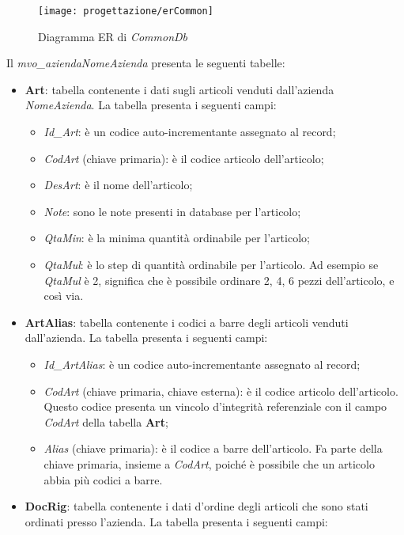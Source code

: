 \begin{figure}[!h] 
    \centering 
    \texttt{[image: progettazione/erCommon]} 
    \caption{Diagramma ER di \textit{CommonDb}}
\end{figure}

Il \textit{mvo\_aziendaNomeAzienda} presenta le seguenti tabelle:
\begin{itemize}
	\item \textbf{Art}: tabella contenente i dati sugli articoli venduti dall'azienda \textit{NomeAzienda}. La tabella presenta i seguenti campi:
		\begin{itemize}
			\item \textit{Id\_Art}: è un codice auto-incrementante assegnato al record;
			\item \textit{CodArt} (chiave primaria): è il codice articolo dell'articolo;
			\item \textit{DesArt}: è il nome dell'articolo;
			\item \textit{Note}: sono le note presenti in database per l'articolo;
			\item \textit{QtaMin}: è la minima quantità ordinabile per l'articolo;
			\item \textit{QtaMul}: è lo step di quantità ordinabile per l'articolo. Ad esempio se \textit{QtaMul} è 2, significa che è possibile ordinare 2, 4, 6 pezzi dell'articolo, e così via.
		\end{itemize}
	\item \textbf{ArtAlias}: tabella contenente i codici a barre degli articoli venduti dall'azienda. La tabella presenta i seguenti campi:
		\begin{itemize}
			\item \textit{Id\_ArtAlias}: è un codice auto-incrementante assegnato al record;
			\item \textit{CodArt} (chiave primaria, chiave esterna): è il codice articolo dell'articolo. Questo codice presenta un vincolo d'integrità referenziale con il campo \textit{CodArt} della tabella \textbf{Art};
			\item \textit{Alias} (chiave primaria): è il codice a barre dell'articolo. Fa parte della chiave primaria, insieme a \textit{CodArt}, poiché è possibile che un articolo abbia più codici a barre.
		\end{itemize}
	\item \textbf{DocRig}: tabella contenente i dati d'ordine degli articoli che sono stati ordinati presso l'azienda. La tabella presenta i seguenti campi:
		\begin{itemize}

\end{itemize}
\end{itemize}
